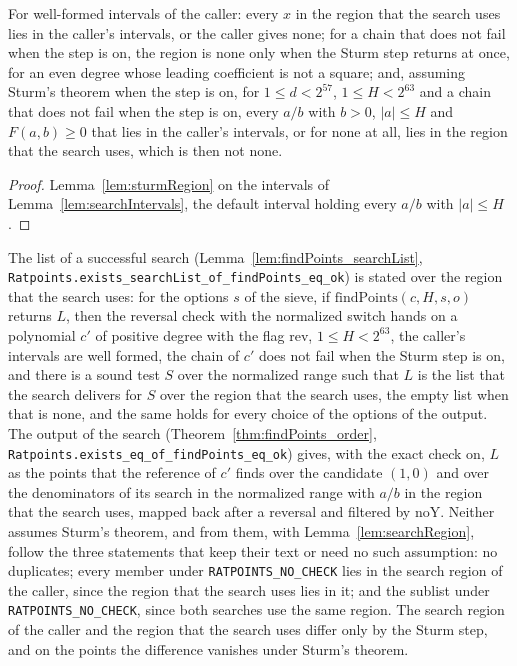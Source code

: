 \begin{lemma}\label{lem:searchRegion}
  \leanok
  For well-formed intervals of the caller: every $x$ in the region that the search uses lies in the
  caller's intervals, or the caller gives none; for a chain that does not fail when the step is on,
  the region is none only when the Sturm step returns at once, for an even degree whose leading
  coefficient is not a square; and, assuming Sturm's theorem when the step is on, for
  $1 \le d < 2^{57}$, $1 \le H < 2^{63}$ and a chain that does not fail when the step is on, every
  $a/b$ with $b > 0$, $|a| \le H$ and $F(a, b) \ge 0$ that lies in the caller's intervals, or for
  none at all, lies in the region that the search uses, which is then not none.
\end{lemma}

\begin{proof}
  \leanok
  Lemma~\ref{lem:sturmRegion} on the intervals of Lemma~\ref{lem:searchIntervals}, the default
  interval holding every $a/b$ with $|a| \le H$.
\end{proof}

The list of a successful search (Lemma~\ref{lem:findPoints_searchList},
\verb|Ratpoints.exists_searchList_of_findPoints_eq_ok|) is stated over the region that the search
uses: for the options $s$ of the sieve, if $\mathrm{findPoints}(c, H, s, o)$ returns $L$, then the
reversal check with the normalized switch hands on a polynomial $c'$ of positive degree with the
flag $\mathrm{rev}$, $1 \le H < 2^{63}$, the caller's intervals are well formed, the chain of $c'$
does not fail when the Sturm step is on, and there is a sound test $S$ over the normalized range
such that $L$ is the list that the search delivers for $S$ over the region that the search uses, the
empty list when that is none, and the same holds for every choice of the options of the output. The
output of the search (Theorem~\ref{thm:findPoints_order},
\verb|Ratpoints.exists_eq_of_findPoints_eq_ok|) gives, with the exact check on, $L$ as the points
that the reference of $c'$ finds over the candidate $(1, 0)$ and over the denominators of its search
in the normalized range with $a/b$ in the region that the search uses, mapped back after a reversal
and filtered by $\mathrm{noY}$. Neither assumes Sturm's theorem, and from them, with
Lemma~\ref{lem:searchRegion}, follow the three statements that keep their text or need no such
assumption: no duplicates; every member under \verb|RATPOINTS_NO_CHECK| lies in the search region of
the caller, since the region that the search uses lies in it; and the sublist under
\verb|RATPOINTS_NO_CHECK|, since both searches use the same region. The search region of the caller
and the region that the search uses differ only by the Sturm step, and on the points the difference
vanishes under Sturm's theorem.

